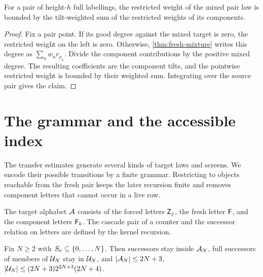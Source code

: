 \begin{lemma}
\label{thm:mixture-tilt}
\leanok
{}
For a pair of height-$h$ full labellings, the restricted weight of the mixed pair law is bounded
by the tilt-weighted sum of the restricted weights of its components.
\end{lemma}

\begin{proof}
\leanok
{}
Fix a pair point. If its good degree against the mixed target is zero, the restricted weight on
the left is zero. Otherwise, \cref{thm:fresh-mixture} writes this degree as
$\sum_a w_a r_{\rho_a}$. Divide the component contributions by the positive mixed degree. The
resulting coefficients are the component tilts, and the pointwise restricted weight is bounded by
their weighted sum. Integrating over the source pair gives the claim.
\end{proof}

\section{The grammar and the accessible index}

The transfer estimates generate several kinds of target laws and screens. We encode their
possible transitions by a finite grammar. Restricting to objects reachable from the fresh pair
keeps the later recursion finite and removes component letters that cannot occur in a live row.

\begin{definition}
\label{def:grammar}
\leanok
The target alphabet $\mathcal{A}$ consists of the forced letters $\mathsf{Z}_j$, the fresh letter $\mathsf{F}$, and
the component letters $\mathsf{F}_k$. The cascade pair of a counter and the successor relation on
letters are defined by the kernel recursion.
\end{definition}

\begin{lemma}
\label{thm:universes}
\leanok
{}
Fix $N\geq2$ with $S_\nu\subseteq\{0,\dots,N\}$. Then successors stay inside $\mathcal{A}_N$, full
successors of members of $\mathcal{U}_N$ stay in $\mathcal{U}_N$, and
$\lvert \mathcal{A}_N \rvert\leq2N+3$, $\lvert \mathcal{U}_N \rvert\leq(2N+3)2^{2N+3}(2N+4)$.
\end{lemma}

